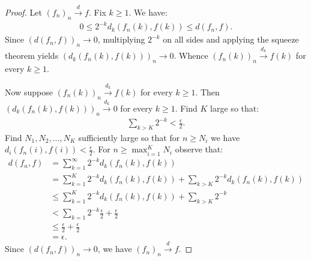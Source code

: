 \documentclass[11pt,twoside,openany]{memoir}
\begin{document}
        {\color{red} \begin{proof}
            Let $(f_n)_n \xrightarrow{d} f$. Fix $k\geq 1$. We have:
                \begin{equation*}
                \begin{split}
                    0 \leq 2^{-k}d_k(f_n(k),f(k)) \leq d(f_n,f).
                \end{split}
                \end{equation*}
            Since $(d(f_n,f))_n \rightarrow 0$, multiplying $2^{-k}$ on all sides and applying the squeeze theorem yields $(d_k(f_n(k),f(k)))_n \rightarrow 0$. Whence $(f_n(k))_n \xrightarrow{d_k} f(k)$ for every $k \geq 1$.

            Now suppose $(f_n(k))_n \xrightarrow{d_k}f(k)$ for every $k \geq 1$. Then $(d_k(f_n(k),f(k)))_n \xrightarrow{d_k} 0$ for every $k \geq 1$. Find $K$ large so that:
                \begin{equation*}
                \begin{split}
                    \sum_{k > K}2^{-k} < \frac{\epsilon}{2}.
                \end{split}
                \end{equation*}
            Find $N_1,N_2,...,N_K$ sufficiently large so that for $n \geq N_i$ we have $d_i(f_n(i),f(i)) < \frac{\epsilon}{2}$. For $n \geq \max_{i = 1}^K N_i$ observe that:
                \begin{equation*}
                \begin{split}
                    d(f_n,f)
                    & = \sum_{k = 1}^\infty 2^{-k}d_k(f_n(k),f(k)) \\
                    & = \sum_{k = 1}^K 2^{-k}d_k(f_n(k),f(k)) + \sum_{k > K} 2^{-k}d_k(f_n(k),f(k)) \\
                    & \leq \sum_{k = 1}^K 2^{-k}d_k(f_n(k),f(k)) + \sum_{k > K} 2^{-k} \\
                    & < \sum_{k = 1}2^{-k}\frac{\epsilon}{2} + \frac{\epsilon}{2} \\
                    & \leq \frac{\epsilon}{2} + \frac{\epsilon}{2} \\
                    & = \epsilon.
                \end{split}
                \end{equation*}
            Since $(d(f_n,f))_n \rightarrow 0$, we have $(f_n)_n \xrightarrow{d} f$.
        \end{proof}}
\end{document}
